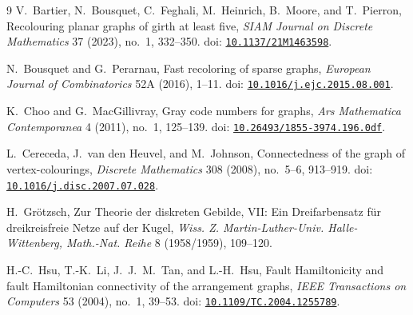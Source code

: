 \documentclass[11pt]{article}
\newcommand{\doi}[1]{doi: \href{https://doi.org/#1}{\nolinkurl{#1}}}
\theoremstyle{remark}
\numberwithin{equation}{section}
\numberwithin{table}{section}
\begin{document}
\begin{thebibliography}{9}
V.~Bartier, N.~Bousquet, C.~Feghali, M.~Heinrich, B.~Moore, and T.~Pierron,
\newblock Recolouring planar graphs of girth at least five,
\newblock \emph{SIAM Journal on Discrete Mathematics} 37 (2023), no.~1, 332--350.
\newblock \doi{10.1137/21M1463598}.

N.~Bousquet and G.~Perarnau,
\newblock Fast recoloring of sparse graphs,
\newblock \emph{European Journal of Combinatorics} 52A (2016), 1--11.
\newblock \doi{10.1016/j.ejc.2015.08.001}.

K.~Choo and G.~MacGillivray,
\newblock Gray code numbers for graphs,
\newblock \emph{Ars Mathematica Contemporanea} 4 (2011), no.~1, 125--139.
\newblock \doi{10.26493/1855-3974.196.0df}.

L.~Cereceda, J.~van den Heuvel, and M.~Johnson,
\newblock Connectedness of the graph of vertex-colourings,
\newblock \emph{Discrete Mathematics} 308 (2008), no.~5--6, 913--919.
\newblock \doi{10.1016/j.disc.2007.07.028}.

H.~Gr\"otzsch,
\newblock Zur Theorie der diskreten Gebilde, VII: Ein Dreifarbensatz f\"ur dreikreisfreie Netze auf der Kugel,
\newblock \emph{Wiss. Z. Martin-Luther-Univ. Halle-Wittenberg, Math.-Nat. Reihe} 8 (1958/1959), 109--120.

H.-C.~Hsu, T.-K.~Li, J.~J.~M.~Tan, and L.-H.~Hsu,
\newblock Fault Hamiltonicity and fault Hamiltonian connectivity of the arrangement graphs,
\newblock \emph{IEEE Transactions on Computers} 53 (2004), no.~1, 39--53.
\newblock \doi{10.1109/TC.2004.1255789}.

\end{thebibliography}

\clearpage
\appendix

\end{document}
